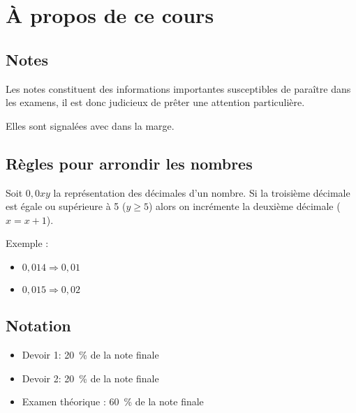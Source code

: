 \chapter*{À propos de ce cours}


\section*{Notes}
\begin{note}
	Les notes constituent des informations importantes susceptibles de paraître dans les examens, il est donc judicieux de prêter une attention particulière. 
\end{note}
Elles sont signalées avec \righthand{} dans la marge.




\section*{Règles pour arrondir les nombres}
Soit $0,0xy$ la représentation des décimales d'un nombre. Si la troisième décimale est égale ou supérieure à 5 ($y \geq 5$) alors on incrémente la deuxième décimale ($x = x + 1$).

Exemple :
\begin{itemize}
	\item $0,014 \Rightarrow 0,01$
	\item $0,015 \Rightarrow 0,02$
\end{itemize}


\section*{Notation}
\begin{itemize}
	\item Devoir 1: 20~\% de la note finale
	\item Devoir 2: 20~\% de la note finale
	\item Examen théorique : 60~\% de la note finale
\end{itemize}